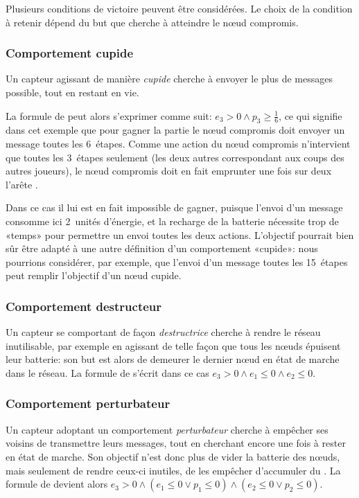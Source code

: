 Plusieurs conditions de victoire peuvent être considérées.
Le choix de la condition à retenir dépend du but que cherche à atteindre le nœud compromis.

        \subsubsection{Comportement cupide}
Un capteur agissant de manière \emph{cupide} cherche à envoyer le plus de messages possible, tout en restant en vie.

La formule de  peut alors s'exprimer comme suit: $e_3 > 0 \wedge p_3 \geq \frac16$, ce qui signifie dans cet exemple que pour gagner la partie le nœud compromis doit envoyer un message toutes les 6~étapes.
Comme une action du nœud compromis n'intervient que toutes les 3~étapes seulement (les deux autres correspondant aux coups des autres joueurs), le nœud compromis doit en fait emprunter une fois sur deux l'arête \startsend.

Dans ce cas il lui est en fait impossible de gagner, puisque l'envoi d'un message consomme ici 2~unités d'énergie, et la recharge de la batterie nécessite trop de «temps» pour permettre un envoi toutes les deux actions.
L'objectif pourrait bien sûr être adapté à une autre définition d'un comportement «cupide»: nous pourrions considérer, par exemple, que l'envoi d'un message toutes les 15~étapes peut remplir l'objectif d'un nœud cupide.

        \subsubsection{Comportement destructeur}
Un capteur se comportant de façon \emph{destructrice} cherche à rendre le réseau inutilisable, par exemple en agissant de telle façon que tous les nœuds épuisent leur batterie: son but est alors de demeurer le dernier nœud en état de marche dans le réseau.
La formule de  s'écrit dans ce cas $e_3 >0 \wedge e_1 \leq 0 \wedge e_2 \leq 0$.

        \subsubsection{Comportement perturbateur}
Un capteur adoptant un comportement \emph{perturbateur} cherche à empêcher ses voisins de transmettre leurs messages, tout en cherchant encore une fois à rester en état de marche.
Son objectif n'est donc plus de vider la batterie des nœuds, mais seulement de rendre ceux-ci inutiles, de les empêcher d'accumuler du .
La formule de  devient alors $e_3 >0 \wedge (e_1 \leq 0 \vee p_1\leq0) \wedge (e_2 \leq 0 \vee p_2\leq0)$.

